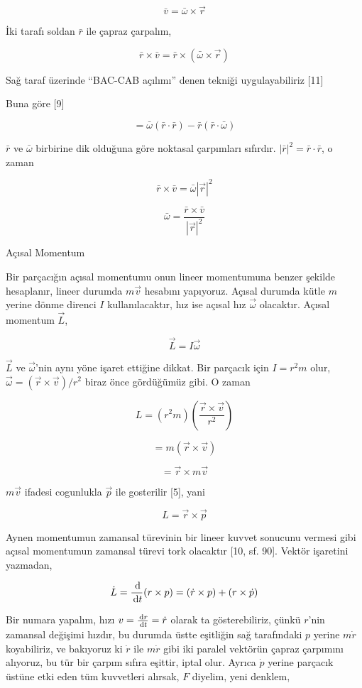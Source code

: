 \documentclass[12pt,fleqn]{article}\usepackage{../../common}
\begin{document}
$$ \bar{v} = \bar{\omega} \times \vec{r}
$$

İki tarafı soldan $\bar{r}$ ile çapraz çarpalım,

$$
\bar{r} \times \bar{v} = \bar{r} \times (\bar{\omega} \times \vec{r})
$$

Sağ taraf üzerinde ``BAC-CAB açılımı'' denen tekniği uygulayabiliriz [11]

Buna göre [9]

$$
= \bar{\omega} (\bar{r} \cdot \bar{r}) - \bar{r}(\bar{r} \cdot \bar{\omega})
$$

$\bar{r}$ ve $\bar{\omega}$ birbirine dik olduğuna göre noktasal çarpımları
sıfırdır. $|\bar{r}|^2 = \bar{r} \cdot \bar{r}$, o zaman

$$
\bar{r} \times \bar{v}  = \bar{\omega} |\vec{r}|^2
$$

$$
\bar{\omega}  = \frac{\bar{r} \times \bar{v}}{|\vec{r}|^2} 
$$

Açısal Momentum

Bir parçacığın açısal momentumu onun lineer momentumuna benzer şekilde
hesaplanır, lineer durumda $m \vec{v}$ hesabını yapıyoruz. Açısal durumda kütle
$m$ yerine dönme direnci $I$ kullanılacaktır, hız ise açısal hız $\vec{\omega}$
olacaktır. Açısal momentum $\vec{L}$,

$$
\vec{L} = I \vec{\omega}
$$

$\vec{L}$ ve $\vec{\omega}$'nin aynı yöne işaret ettiğine dikkat. Bir parçacık 
için $I = r^2 m$ olur, $\vec{\omega} = (\vec{r} \times \vec{v}) / r^2$ biraz
önce gördüğümüz gibi. O zaman

$$
L = (r^2 m) \left( \frac{\vec{r} \times \vec{v}}{r^2}  \right)
$$

$$
= m (\vec{r} \times \vec{v})
$$

$$
 = \vec{r} \times m\vec{v}
$$

$m\vec{v}$ ifadesi cogunlukla $\vec{p}$ ile gosterilir [5], yani

$$
L = \vec{r} \times \vec{p}
$$

Aynen momentumun zamansal türevinin bir lineer kuvvet sonucunu vermesi gibi
açısal momentumun zamansal türevi tork olacaktır [10, sf. 90]. Vektör işaretini
yazmadan,

$$
\dot{L} = \frac{\,\mathrm{d} }{\,\mathrm{d} t} (r \times p)  =
(\dot{r} \times p) + (r \times \dot{p})
$$

Bir numara yapalım, hızı $v = \frac{\,\mathrm{d} r}{\,\mathrm{d} t} = \dot{r}$ olarak ta
gösterebiliriz, çünkü $r$'nin zamansal değişimi hızdır, bu durumda üstte
eşitliğin sağ tarafındaki $p$ yerine $m\dot{r}$ koyabiliriz, ve bakıyoruz ki
$\dot{r}$ ile $m\dot{r}$ gibi iki paralel vektörün çapraz çarpımını alıyoruz, bu
tür bir çarpım sıfıra eşittir, iptal olur. Ayrıca $\dot{p}$ yerine parçacık
üstüne etki eden tüm kuvvetleri alırsak, $F$ diyelim, yeni denklem,
\end{document}
